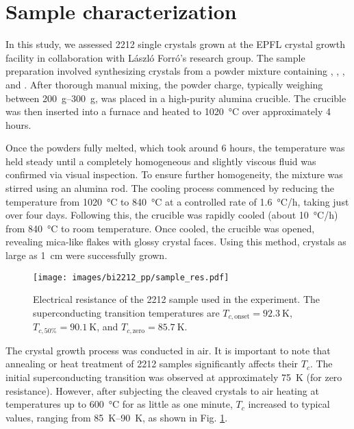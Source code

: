 \section{Sample characterization}

In this study, we assessed 2212 single crystals grown at the EPFL crystal growth facility in collaboration with László Forró's research group.
The sample preparation involved synthesizing crystals from a powder mixture containing , , , and .
After thorough manual mixing, the powder charge, typically weighing between \qtyrange{200}{300}{\gram}, was placed in a high-purity alumina crucible. The crucible was then inserted into a furnace and heated to \qty{1020}{\degreeCelsius} over approximately 4 hours.

Once the powders fully melted, which took around 6 hours, the temperature was held steady until a completely homogeneous and slightly viscous fluid was confirmed via visual inspection.
To ensure further homogeneity, the mixture was stirred using an alumina rod.
The cooling process commenced by reducing the temperature from \qty{1020}{\degreeCelsius} to \qty{840}{\degreeCelsius} at a controlled rate of \qty{1.6}{\degreeCelsius/\hour}, taking just over four days.
Following this, the crucible was rapidly cooled (about \qty{10}{\degreeCelsius/\hour}) from \qty{840}{\degreeCelsius} to room temperature. Once cooled, the crucible was opened, revealing mica-like flakes with glossy crystal faces. Using this method, crystals as large as \qty{1}{\centi\meter} were successfully grown.

\begin{figure}
	\centering
	\texttt{[image: images/bi2212\_pp/sample\_res.pdf]}
	\caption{Electrical resistance of the 2212 sample used in the experiment. The superconducting transition temperatures are $T_{c,\text{onset}} = \qty{92.3}{\kelvin}$, $T_{c,\text{50\%}} = \qty{90.1}{\kelvin}$, and $T_{c,\text{zero}} = \qty{85.7}{\kelvin}$.}
	\label{fig:sample_res}
\end{figure}

The crystal growth process was conducted in air.
It is important to note that annealing or heat treatment of 2212 samples significantly affects their $T_c$.
The initial superconducting transition was observed at approximately \qty{75}{\kelvin} (for zero resistance).
However, after subjecting the cleaved crystals to air heating at temperatures up to \qty{600}{\degreeCelsius} for as little as one minute, $T_c$ increased to typical values, ranging from \qtyrange{85}{90}{\kelvin}, as shown in Fig. \ref{fig:sample_res}.

